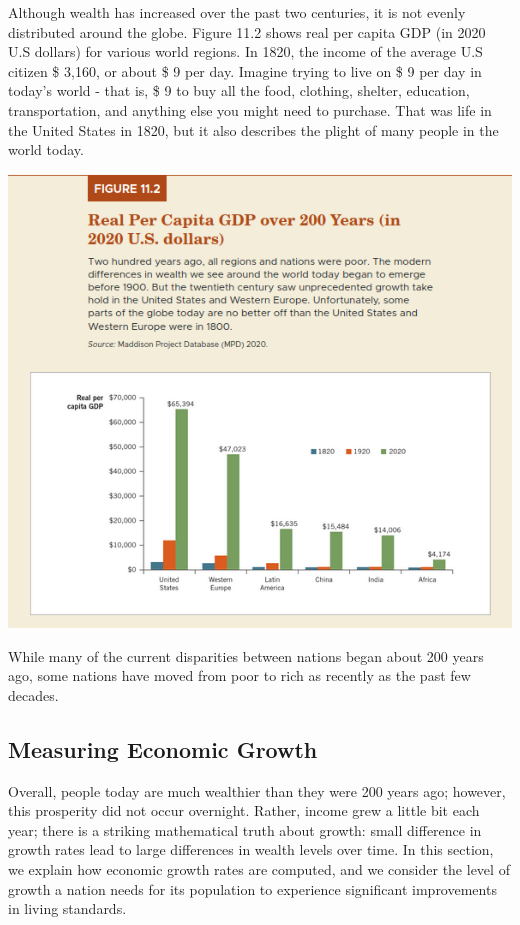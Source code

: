 \documentclass[11pt]{article} %
\begin{document}
Although wealth has increased over the past two centuries, it is not evenly distributed around the globe. Figure 11.2 shows real per capita GDP (in 2020 U.S dollars) for various world regions. In 1820, the income of the average U.S citizen \$ 3,160, or about \$ 9 per day. Imagine trying to live  on \$ 9 per day in today's world - that is, \$ 9 to buy all the food, clothing, shelter, education, transportation, and anything else you might need to purchase. That was life in the United States in 1820, but it also describes the plight of many people in the world today.

\begin{center}
\includegraphics[scale=0.3]{../../images/Chapter 11/Figure 11.2.png}
\end{center}

While many of the current disparities between nations began about 200 years ago, some nations have moved from poor to rich as recently as the past few decades.

\subsection*{Measuring Economic Growth}

Overall, people today are much wealthier than they were 200 years ago; however, this prosperity did not occur overnight. Rather, income grew a little bit each year; there is a striking mathematical truth about growth: small difference in growth rates lead to large differences in wealth levels over time.  In this section, we explain how economic growth rates are computed, and we consider the level of growth a nation needs for its population to experience significant improvements in living standards.
\end{document}
